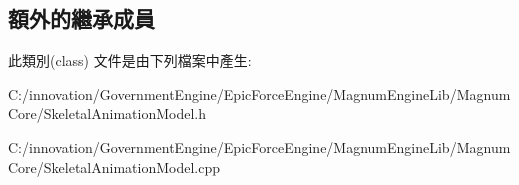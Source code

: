 \subsection*{額外的繼承成員}


此類別(class) 文件是由下列檔案中產生\+:\begin{DoxyCompactItemize}
\item 
C\+:/innovation/\+Government\+Engine/\+Epic\+Force\+Engine/\+Magnum\+Engine\+Lib/\+Magnum\+Core/Skeletal\+Animation\+Model.\+h\item 
C\+:/innovation/\+Government\+Engine/\+Epic\+Force\+Engine/\+Magnum\+Engine\+Lib/\+Magnum\+Core/Skeletal\+Animation\+Model.\+cpp\end{DoxyCompactItemize}
